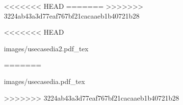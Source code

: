 
\makeatletter {}\makeatother 
\setlength {\pdfpagewidth }{475.16104pt}
<<<<<<< HEAD
\setlength {\pdfpageheight }{356.2046pt}
=======
\setlength {\pdfpageheight }{365.9198pt}
>>>>>>> 3224ab43a3d77eaf767bf21cacaaeb1b40721b28
\setlength {\paperheight }{\pdfpageheight }
\setlength {\paperwidth }{\pdfpagewidth }
\setlength {\textheight }{\paperheight }
\setlength {\textwidth }{\paperwidth }
\setlength {\textheight }{\paperheight }
\setlength {\oddsidemargin }{-1in}
\setlength {\evensidemargin }{-1in}
\setlength {\topmargin }{-1in}
\setlength {\headheight }{0in}
\setlength {\headsep }{0in}
\setlength {\topskip }{0in}
\setlength {\footskip }{0in}
\setlength {\parindent }{0in}
\setlength {\parsep }{0in}
\setlength {\parskip }{0in}

<<<<<<< HEAD
\pagestyle {empty}\begin {center}\def \svgwidth {0.99\textwidth } {images/}{usecasedia2.pdf_tex}\end {center}
=======
\pagestyle {empty}\begin {center}\def \svgwidth {0.99\textwidth } {images/}{usecasedia.pdf_tex}\end {center}
>>>>>>> 3224ab43a3d77eaf767bf21cacaaeb1b40721b28

